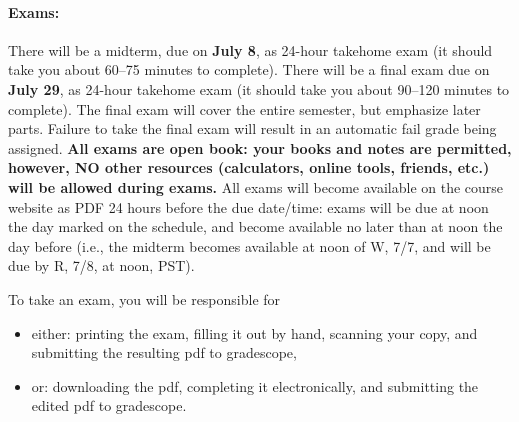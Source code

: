 \documentclass[11pt,letter]{article}
\begin{document}
%


\paragraph{Exams:} There will be a midterm, due on \textbf{July 8}, as 24-hour takehome exam (it should take you about 60--75 minutes to complete). There will be a final exam due on \textbf{July 29}, as 24-hour takehome exam (it should take you about 90--120 minutes to complete). The final exam will cover the entire semester, but emphasize later parts. Failure to take the final exam will result in an automatic fail grade being assigned. \textbf{All exams are open book: your books and notes are permitted, however, NO other resources (calculators, online tools, friends, etc.) will be allowed during exams.} All exams will become available on the course website as PDF 24 hours before the due date/time: exams will be due at noon the day marked on the schedule, and become available no later than at noon the day before (i.e., the midterm becomes available at noon of W, 7/7, and will be due by R, 7/8, at noon, PST).\bigskip

To take an exam, you will be responsible for
\begin{itemize}
\item either: printing the exam, filling it out by hand, scanning your copy, and submitting the resulting pdf to gradescope,
\item or: downloading the pdf, completing it electronically, and submitting the edited pdf to gradescope.
\end{itemize}
\end{document}
